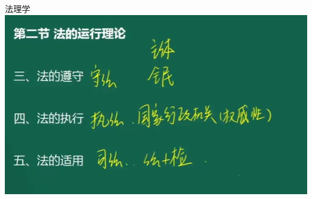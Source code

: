 \documentclass[aspectratio=169]{beamer}
\begin{document}
\begin{frame}[t]{法理学}
    \includegraphics[scale=0.5]{law-run-theory_2}\\ 
\end{frame}
\end{document}
